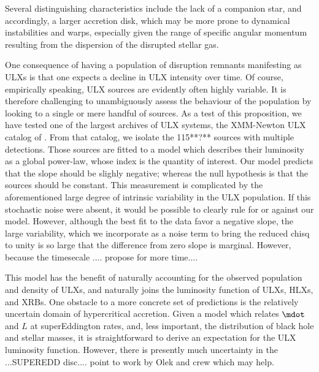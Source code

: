 Several distinguishing characteristics include the lack of a companion star, and accordingly, a larger accretion disk, which may be more prone to dynamical instabilities and warps, especially given the range of specific angular momentum resulting from the dispersion of the disrupted stellar gas.

One consequence of having a population of disruption remnants manifesting as ULXs is that one expects a decline in ULX intensity over time.  Of course, empirically speaking, ULX sources are evidently often highly variable.  It is therefore challenging to unambiguously assess the behaviour of the population by looking to a single or mere handful of sources.  As a test of this proposition, we have tested one of the largest archives of ULX systems, the XMM-Newton ULX catalog of \citep{Walton_2012}.  From that catalog, we isolate the 115**?** sources with multiple detections.  Those sources are fitted to a model which describes their luminosity as a global power-law, whose index is the quantity of interest.  Our model predicts that the slope should be slighly negative; whereas the null hypothesis is that the sources should be constant.   This measurement is complicated by the aforementioned large degree of intrinsic variability in the ULX population.  If this stochastic noise were absent, it would be possible to clearly rule for or against our model.  However, although the best fit to the data favor a negative slope, the large variability, which we incorporate as a noise term to bring the reduced chisq to unity is so large that the difference from zero slope is marginal.  However, because the timesecale .... propose for more time....







This model has the benefit of naturally accounting for the observed population and density of ULXs, and naturally joins the luminosity function of ULXs, HLXs, and XRBs.  One obstacle to a more concrete set of predictions is the relatively uncertain domain of hypercritical accretion.  Given a model which relates $\mdot$ and $L$ at superEddington rates, and, less important, the distribution of black hole and stellar masses, it is straightforward to derive an expectation for the ULX luminosity function.  However, there is presently much uncertainty in the ...SUPEREDD disc.... point to work by Olek and crew which may help.















